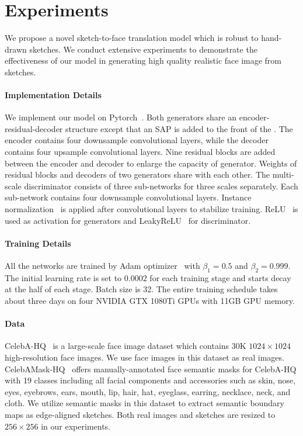 \section{Experiments}
\label{sec:experiments}

We propose a novel sketch-to-face translation model which is robust to hand-drawn sketches. We conduct extensive experiments to demonstrate the effectiveness of our model in generating high quality realistic face image from sketches. 

\paragraph{Implementation Details}
We implement our model on Pytorch~\cite{Pytorch}. Both generators share an encoder-residual-decoder structure except that an SAP is added to the front of the . The encoder contains four downsample convolutional layers, while the decoder contains four upsample convolutional layers. Nine residual blocks are added between the encoder and decoder to enlarge the capacity of generator. Weights of residual blocks and decoders of two generators share with each other. The multi-scale discriminator consists of three sub-networks for three scales separately. Each sub-network contains four downsample convolutional layers. Instance normalization~\cite{IN} is applied after convolutional layers to stabilize training. ReLU~\cite{ReLU} is used as activation for generators and LeakyReLU~\cite{LeakyReLU} for discriminator. 
%

\paragraph{Training Details}
All the networks are trained by Adam optimizer~\cite{Adam} with $\beta_1=0.5$ and $\beta_2=0.999$. The initial learning rate is set to $0.0002$ for each training stage and starts decay at the half of each stage. Batch size is 32. The entire training schedule takes about three days on four NVIDIA GTX 1080Ti GPUs with 11GB GPU memory.

\paragraph{Data}
CelebA-HQ~\cite{PGGAN} is a large-scale face image dataset which contains 30K $1024\times1024$ high-resolution face images. We use face images in this dataset as real images.
CelebAMask-HQ~\cite{CelebAMask-HQ} offers manually-annotated face semantic masks for CelebA-HQ with 19 classes including all facial components and accessories such as skin, nose, eyes, eyebrows, ears, mouth, lip, hair, hat, eyeglass, earring, necklace, neck, and cloth. We utilize semantic masks in this dataset to extract semantic boundary maps as edge-aligned sketches. Both real images and sketches are resized to $256\times256$ in our experiments.

